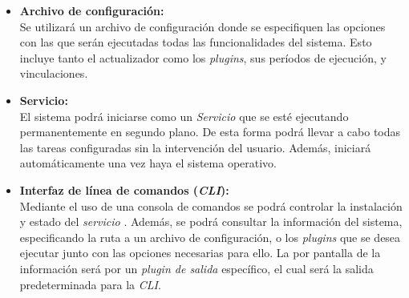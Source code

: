 \begin{itemize}
            \item \textbf{Archivo de configuración:} \\
                Se utilizará un archivo de configuración donde se especifiquen las opciones con las que serán ejecutadas todas las funcionalidades del sistema. Esto incluye tanto el actualizador como los \textit{plugins}, sus períodos de ejecución, y vinculaciones.
                
            \item \textbf{Servicio:} \\
                El sistema podrá iniciarse como un \textit{Servicio} que se esté ejecutando permanentemente en segundo plano. De esta forma podrá llevar a cabo todas las tareas configuradas sin la intervención del usuario. Además, iniciará automáticamente una vez haya  el sistema operativo.
                
            \item \textbf{Interfaz de línea de comandos (\textit{CLI}):} \\
                Mediante el uso de una consola de comandos se podrá controlar la instalación y estado del \textit{servicio} . Además, se podrá consultar la información del sistema, especificando la ruta a un archivo de configuración, o los \textit{plugins} que se desea ejecutar junto con las opciones necesarias para ello. La  por pantalla de la información será  por un \textit{plugin de salida} específico, el cual será la salida predeterminada para la \textit{CLI}. 
        \end{itemize}


%

    